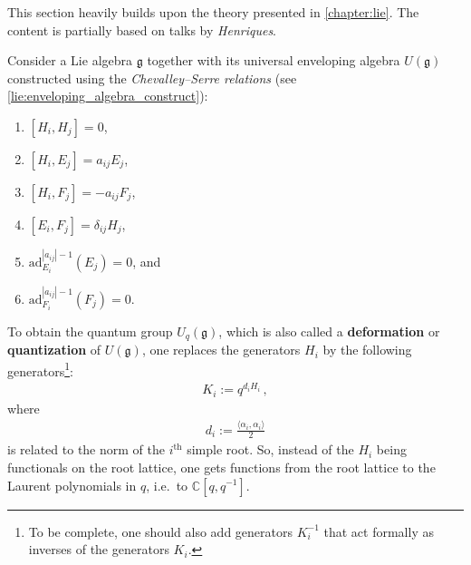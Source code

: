     This section heavily builds upon the theory presented in \cref{chapter:lie}. The content is partially based on talks by \textit{Henriques}.

    \begin{construct}
        Consider a Lie algebra $\mathfrak{g}$ together with its universal enveloping algebra $U(\mathfrak{g})$ constructed using the \textit{Chevalley--Serre relations} (see \cref{lie:enveloping_algebra_construct}):
        \begin{enumerate}
            \item $[H_i,H_j] = 0$,
            \item $[H_i,E_j] = a_{ij}E_j$,
            \item $[H_i,F_j] = -a_{ij}F_j$,
            \item $[E_i,F_j] = \delta_{ij}H_j$,
            \item $\mathrm{ad}_{E_i}^{|a_{ij}|-1}(E_j) = 0$, and
            \item $\mathrm{ad}_{F_i}^{|a_{ij}|-1}(F_j) = 0$.
        \end{enumerate}
         To obtain the quantum group $U_q(\mathfrak{g})$, which is also called a \textbf{deformation} or \textbf{quantization} of $U(\mathfrak{g})$, one replaces the generators $H_i$ by the following generators\footnote{To be complete, one should also add generators $K_i^{-1}$ that act formally as inverses of the generators $K_i$.}:
        \begin{gather}
            K_i := q^{d_iH_i}\,,
        \end{gather}
        where
        \begin{gather}
            d_i := \frac{\langle\alpha_i,\alpha_i\rangle}{2}
        \end{gather}
        is related to the norm of the $i^{\text{th}}$ simple root. So, instead of the $H_i$ being functionals on the root lattice, one gets functions from the root lattice to the Laurent polynomials in $q$, i.e.~to $\mathbb{C}[q,q^{-1}]$.


\end{construct}
